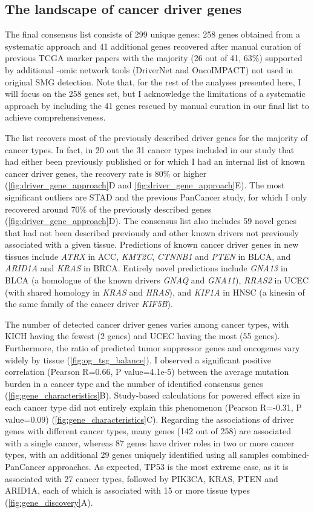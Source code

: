 \subsection{The landscape of cancer driver genes}
The final consensus list consists of 299 unique genes: 258 genes obtained from a systematic approach and 41 additional genes recovered after manual curation of previous TCGA marker papers with the majority (26 out of 41, 63\%) supported by additional -omic network tools (DriverNet and OncoIMPACT) not used in original SMG detection. Note that, for the rest of the analyses presented here, I will focus on the 258 genes set, but I acknowledge the limitations of a systematic approach by including the 41 genes rescued by manual curation in our final list to achieve comprehensiveness.

The list recovers most of the previously described driver genes for the majority of cancer types. In fact, in 20 out the 31 cancer types included in our study that had either been previously published or for which I had an internal list of known cancer driver genes, the recovery rate is 80\% or higher (\autoref{fig:driver_gene_approach}D and \autoref{fig:driver_gene_approach}E). The most significant outliers are STAD and the previous PanCancer study, for which I only recovered around 70\% of the previously described genes (\autoref{fig:driver_gene_approach}D). The consensus list also includes 59 novel genes that had not been described previously and other known drivers not previously associated with a given tissue. Predictions of known cancer driver genes in new tissues include \textit{ATRX} in ACC, \textit{KMT2C}, \textit{CTNNB1} and \textit{PTEN} in BLCA, and \textit{ARID1A} and \textit{KRAS} in BRCA. Entirely novel predictions include \textit{GNA13} in BLCA (a homologue of the known drivers \textit{GNAQ} and \textit{GNA11}), \textit{RRAS2} in UCEC (with shared homology in \textit{KRAS} and \textit{HRAS}), and \textit{KIF1A} in HNSC (a kinesin of the same family of the cancer driver \textit{KIF5B}). 

The number of detected cancer driver genes varies among cancer types, with KICH having the fewest (2 genes) and UCEC having the most (55 genes). Furthermore, the ratio of predicted tumor suppressor genes and oncogenes vary widely by tissue (\autoref{fig:og_tsg_balance}). I observed a significant positive correlation (Pearson R=0.66, P value=4.1e-5) between the average mutation burden in a cancer type and the number of identified consensus genes (\autoref{fig:gene_characteristics}B). Study-based calculations for powered effect size in each cancer type did not entirely explain this phenomenon (Pearson R=-0.31, P value=0.09) (\autoref{fig:gene_characteristics}C). Regarding the associations of driver genes with different cancer types, many genes (142 out of 258) are associated with a single cancer, whereas 87 genes have driver roles in two or more cancer types, with an additional 29 genes uniquely identified using all samples combined-PanCancer approaches. As expected, TP53 is the most extreme case, as it is associated with 27 cancer types, followed by PIK3CA, KRAS, PTEN and ARID1A, each of which is associated with 15 or more tissue types (\autoref{fig:gene_discovery}A).

